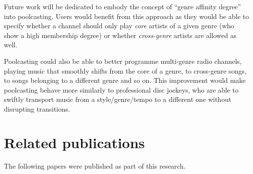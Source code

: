 Future work will be dedicated to embody the concept of ``genre affinity degree'' into poolcasting.
Users would benefit from this approach as they would be able to specify whether 
a channel should only play \emph{core} artists of a given genre (who show a high membership degree) or whether \emph{cross-genre} artists are allowed as well.

Poolcasting could also be able to better programme multi-genre radio channels, playing music that smoothly shifts from the core of a genre, to cross-genre songs, to songs belonging to a different genre and so on.
This improvement would make poolcasting behave more similarly to professional disc jockeys, who are able to swiftly transport music from a style/genre/tempo to a different one without disrupting transitions.









\section{Related publications} %
\label{sec:future_work}

The following papers were published as part of this research.

